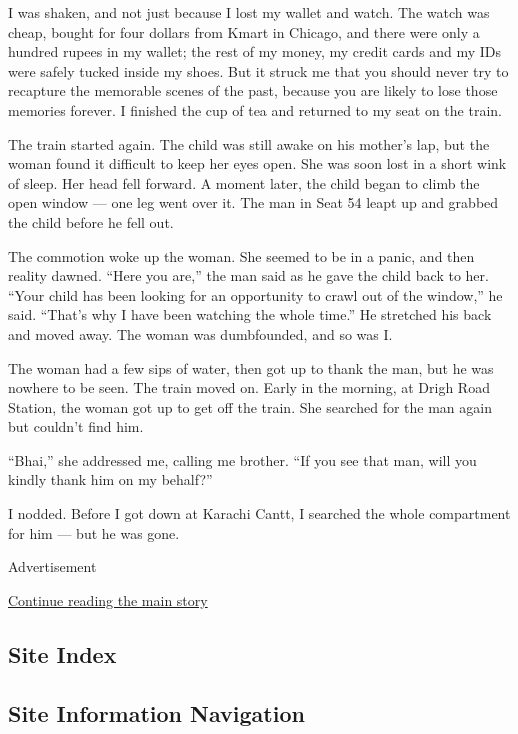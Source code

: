 I was shaken, and not just because I lost my wallet and watch. The watch
was cheap, bought for four dollars from Kmart in Chicago, and there were
only a hundred rupees in my wallet; the rest of my money, my credit
cards and my IDs were safely tucked inside my shoes. But it struck me
that you should never try to recapture the memorable scenes of the past,
because you are likely to lose those memories forever. I finished the
cup of tea and returned to my seat on the train.

The train started again. The child was still awake on his mother's lap,
but the woman found it difficult to keep her eyes open. She was soon
lost in a short wink of sleep. Her head fell forward. A moment later,
the child began to climb the open window --- one leg went over it. The
man in Seat 54 leapt up and grabbed the child before he fell out.

The commotion woke up the woman. She seemed to be in a panic, and then
reality dawned. ``Here you are,'' the man said as he gave the child back
to her. ``Your child has been looking for an opportunity to crawl out of
the window,'' he said. ``That's why I have been watching the whole
time.'' He stretched his back and moved away. The woman was dumbfounded,
and so was I.

The woman had a few sips of water, then got up to thank the man, but he
was nowhere to be seen. The train moved on. Early in the morning, at
Drigh Road Station, the woman got up to get off the train. She searched
for the man again but couldn't find him.

``Bhai,'' she addressed me, calling me brother. ``If you see that man,
will you kindly thank him on my behalf?''

I nodded. Before I got down at Karachi Cantt, I searched the whole
compartment for him --- but he was gone.

Advertisement

\protect\hyperlink{after-bottom}{Continue reading the main story}

\hypertarget{site-index}{%
\subsection{Site Index}\label{site-index}}

\hypertarget{site-information-navigation}{%
\subsection{Site Information
Navigation}\label{site-information-navigation}}


